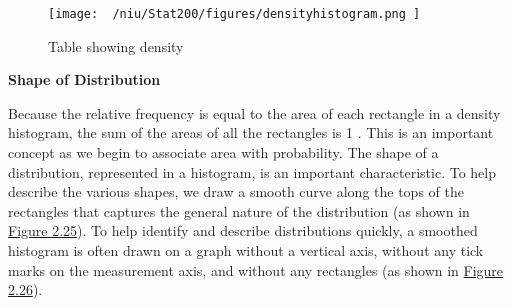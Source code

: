 \documentclass{report}
\begin{document}
\bigbreak \noindent \bigbreak \noindent \bigbreak \noindent
\begin{figure}[ht]
\centering
\texttt{[image:  ~/niu/Stat200/figures/densityhistogram.png ]}
\caption{Table showing density}
\end{figure}

\pagebreak

\begin{LARGE}
\noindent \textbf{Shape of Distribution}
\end{LARGE}
\bigbreak \noindent
\begin{mdframed}
 Because the relative frequency is equal to the area of each rectangle in a density histogram, the sum of the areas of all the rectangles is 1 . This is an important concept as we begin to associate area with probability.
\bigbreak \noindent
The shape of a distribution, represented in a histogram, is an important characteristic. To help describe the various shapes, we draw a smooth curve along the tops of the rectangles that captures the general nature of the distribution (as shown in \underline{Figure 2.25}). To help identify and describe distributions quickly, a smoothed histogram is often drawn on a graph without a vertical axis, without any tick marks on the measurement axis, and without any rectangles (as shown in \underline{Figure 2.26}). 
\end{mdframed}
\vspace{3mm}
\end{document}

